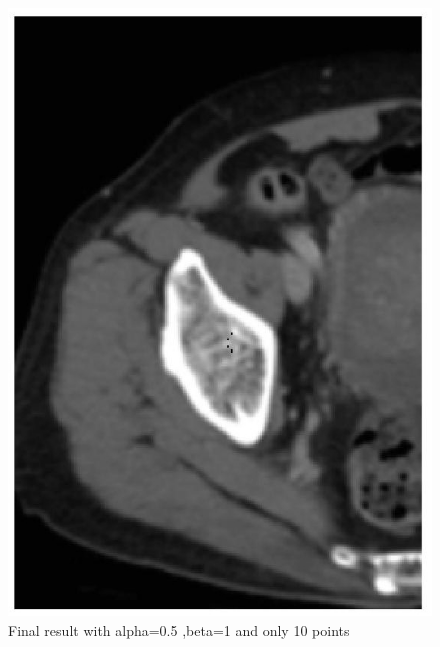 \documentclass[paper=a4, fontsize=11pt]{scrartcl} %
\numberwithin{equation}{section} %
\numberwithin{figure}{section} %
\numberwithin{table}{subsection} %
\begin{document}
\begin{figure}[!htbp]
	\centering
	\includegraphics[width = 12cm]{p3_6.jpg}
	\caption{Final result with alpha=0.5 ,beta=1 and only 10 points}
\end{figure}



\end{document}
